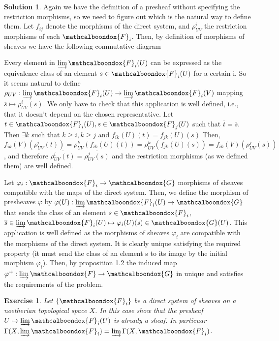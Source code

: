 \documentclass[12pt]{article}
\newtheorem{ex}{Exercise}[section]
\theoremstyle{definition}
\newtheorem*{sol}{Solution}
\newcommand{\sF}{\ensuremath{\mathcalboondox{F}}}
\newcommand{\sG}{\ensuremath{\mathcalboondox{G}}}
\begin{document}
\begin{sol}
	Again we have the definition of a presheaf without specifying the restriction morphisms, so we need to figure out which is the natural way to define them. Let $f_{ij}$ denote the morphisms of the direct system, and $\rho^i_{UV}$ the restriction morphisms of each $\sF_i$. Then, by definition of morphisms of sheaves we have the following commutative diagram

	Every element in $\varinjlim \sF_i(U)$ can be expressed as the equivalence class of an element $s \in \sF_i(U)$ for a certain i. So it seems natural to define $\rho_{UV}: \varinjlim \sF_i(U) \to \varinjlim \sF_i(V)$ mapping $\overline{s} \mapsto \overline{\rho^i_{UV}(s)}$. We only have to check that this application is well defined, i.e., that it doesn't depend on the chosen representative. Let $t \in \sF_i(U), s \in \sF_j(U)$ such that $\overline{t} = \overline{s}$. Then $\exists k$ such that $k \geq i, k \geq j$ and $f_{ik}(U)(t) = f_{jk}(U)(s)$ Then, $f_{ik}(V)(\rho_{UV}^i(t)) = \rho^k_{UV}(f_{ik}(U)(t)) = \rho_{UV}^k(f_{jk}(U)(s)) = f_{ik}(V)(\rho^j_{UV}(s))$, and therefore $\overline{\rho^i_{UV}(t)} = \overline{\rho^j_{UV}(s)}$ and the restriction morphisms (as we defined them) are well defined.

	Let $\varphi_i: \sF_i \to \sG$ morphisms of sheaves compatible with the maps of the direct system. Then, we define the morphism of presheaves $\varphi$ by $\varphi(U): \varinjlim \sF_i(U) \to \sG$ that sends the class of an element $s \in \sF_i$, $\overline{s} \in \varinjlim \sF_i(U) \mapsto \varphi_i(U)(s) \in \sG(U)$. This application is well defined as the morphisms of sheaves $\varphi_i$ are compatible with the morphisms of the direct system. It is clearly unique satisfying the required property (it must send the class of an element s to its image by the initial morphism $\varphi_i$). Then, by proposition 1.2 the induced map $\varphi^{+}: \varinjlim \sF \to \sG$ in unique and satisfies the requirements of the problem.
\end{sol}

\begin{ex}
	Let $\{\sF_i\}$ be a direct system of sheaves on a noetherian topological space $X$. In this case show that the presheaf $U \mapsto \varinjlim \sF_i(U)$ is already a sheaf. In particuar $\Gamma(X, \varinjlim \sF_i) = \varinjlim \Gamma(X,\sF_i)$.
\end{ex}
\end{document}
